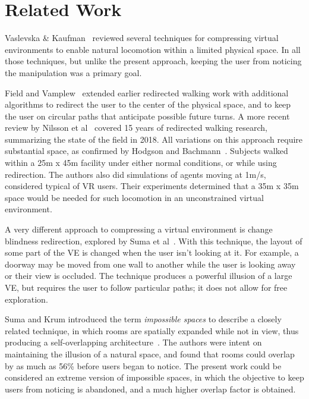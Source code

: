 \documentclass{sigchi}
\begin{document}
\section{Related Work}

Vaslevska \& Kaufman~\cite{vasylevska2017compressing} reviewed several techniques for compressing virtual environments to enable natural locomotion within a limited physical space.  In all those techniques, but unlike the present approach, keeping the user from noticing the manipulation was a primary goal.

Field and Vamplew~\cite{field2004generalised} extended earlier redirected walking work with additional algorithms to redirect the user to the center of the physical space, and to keep the user on circular paths that anticipate possible future turns.  A more recent review by Nilsson et al~\cite{nilsson201815} covered 15 years of redirected walking research, summarizing the state of the field in 2018.  All variations on this approach require substantial space, as confirmed by Hodgson and Bachmann~\cite{hodgson2013comparing}.  Subjects walked within a 25m x 45m facility under either normal conditions, or while using redirection.  The authors also did simulations of agents moving at 1m/s, considered typical of VR users.  Their experiments determined that a 35m x 35m space would be needed for such locomotion in an unconstrained virtual environment.

A very different approach to compressing a virtual environment is change blindness redirection, explored by Suma et al~\cite{suma2011leveraging}.  With this technique, the layout of some part of the VE is changed when the user isn’t looking at it.  For example, a doorway may be moved from one wall to another while the user is looking away or their view is occluded.  The technique produces a powerful illusion of a large VE, but requires the user to follow particular paths; it does not allow for free exploration.

Suma and Krum introduced the term \textit{impossible spaces} to describe a closely related technique, in which rooms are spatially expanded while not in view, thus producing a self-overlapping architecture~\cite{suma2012impossible}.  The authors were intent on maintaining the illusion of a natural space, and found that rooms could overlap by as much as 56\% before users began to notice.  The present work could be considered an extreme version of impossible spaces, in which the objective to keep users from noticing is abandoned, and a much higher overlap factor is obtained.
\end{document}
